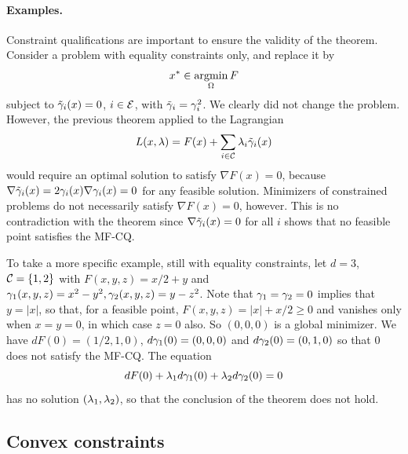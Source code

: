 \paragraph{Examples.}
Constraint qualifications are important to ensure the validity of the theorem.
Consider a problem with equality constraints only, and replace it by
\[
x^* \in \operatorname*{argmin}_{\Omega} F
\]
subject to  $\tilde {\gamma}_i(x) = 0$, $i\in {\mathcal E}$, with $\tilde {\gamma}_i = \gamma_i^2$.
We clearly did not change the problem. However, the previous theorem applied to the Lagrangian 
\[
L(x, \lambda) = F(x) + \sum_{i\in {\mathcal C}} \lambda_i \tilde {\gamma}_i(x)
\]
would require an optimal solution to satisfy $\nabla F(x) = 0$, because $\nabla\tilde {\gamma}_i(x) = 2\gamma_i(x) \nabla \gamma_i(x) = 0$ for any feasible solution. Minimizers of constrained problems do not necessarily satisfy $\nabla F(x) = 0$, however. This is no contradiction with the theorem since $\nabla\tilde {\gamma}_i(x) = 0$ for all $i$ shows that no feasible point satisfies the MF-CQ.


To take a more specific example, still with equality constraints,
let $d=3$, ${\mathcal C}=\{1,2\}$ with
$F(x,y,z) =  x/2 + y$ and $\gamma_1(x,y,z) = x^2 - y^2, \gamma_2(x,y,z) = y-z^2$. 
Note that
$\gamma_1 = \gamma_2 = 0$ implies that $y = |x|$, so that, for a feasible point, $F(x,y,z) = |x| + x/2 \geq 0$ and
vanishes only when $x=y=0$, in which case $z=0$ also. So $(0,0,0)$ is a global minimizer.
We have $dF(0) = (1/2, 1, 0)$, $d\gamma_1(0) = (0,0,0)$ and $d\gamma_2(0) = (0,1,0)$ so that 0 does not satisfy the MF-CQ.
The equation
\[
dF(0) + \lambda_1 d\gamma_1(0) + \lambda_2 d\gamma_2(0) = 0
\]
has no solution $(\lambda_1, \lambda_2)$, so that the conclusion of the theorem does not hold.

\subsection{Convex constraints}

